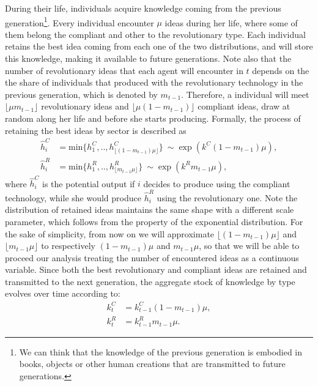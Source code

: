During their life, individuals acquire knowledge coming from the previous generation\footnote{We can think that the knowledge of the previous generation is embodied in books, objects or other human creations that are transmitted to future generations.}. Every individual encounter $\mu$ ideas during her life, where some of them belong the compliant and other to the revolutionary type. Each individual retains the best idea coming from each one of the two distributions, and will store this knowledge, making it available to future generations. Note also that the number of revolutionary ideas that each agent will encounter in $t$ depends on the the share of individuals that produced with the revolutionary technology in the previous generation, which is denoted by  $m_{t-1}$. Therefore, a individual will meet $\lfloor \mu m_{t-1} \rfloor$ revolutionary ideas  and $\lfloor \mu (1-m_{t-1}) \rfloor$ compliant ideas, draw at random along her life and before she starts producing. Formally, the process of retaining the best ideas by sector is described as
\begin{align*}	
\hat{h}^C_i&=\text{min}\{h^C_1,..,h^C_{\lfloor(1-m_{t-1}) \mu\rfloor}\}\ \sim \exp(k^C (1-m_{t-1}) \mu),
\\ \hat{h}^R_i&=\text{min}\{h^R_1,..,h^R_{\lfloor m_{t-1} \mu \rfloor}\}\ \sim \exp(k^R m_{t-1} \mu),
\end{align*}
where $ \hat{h}^C_i$ is the potential output if $i$ decides to produce using the compliant technology, while she would produce $ \hat{h}^R_i$ using the revolutionary one. Note the distribution of retained ideas maintains the same shape with a different scale parameter, which follows from the property of the exponential distribution. For the sake of simplicity, from now on we will approximate $\lfloor(1-m_{t-1}) \mu\rfloor$ and $\lfloor m_{t-1} \mu \rfloor$ to respectively  $(1-m_{t-1}) \mu$ and $m_{t-1} \mu $, so that we will be able to proceed our analysis treating the number of encountered ideas as a continuous variable. Since both the best revolutionary and compliant ideas are retained and transmitted to the next generation, the aggregate stock of knowledge by type evolves over time according to:
\begin{align}
k_{t}^C&=k_{t-1}^C (1-m_{t-1}) \mu,\label{eq:kCtime} \\
k_{t}^R&=k_{t-1}^R m_{t-1} \label{eq:kRtime} \mu.
\end{align}

